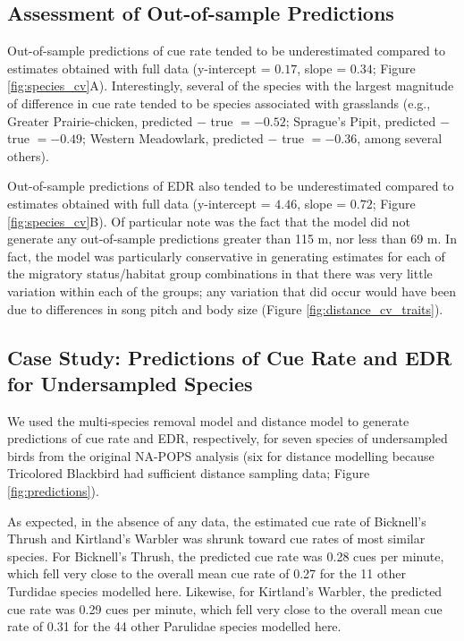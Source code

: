 \documentclass[12pt]{article}
\begin{document}
\subsection{Assessment of Out-of-sample Predictions}

\par Out-of-sample predictions of cue rate tended to be underestimated compared to estimates obtained with full data (y-intercept = $0.17$, slope = $0.34$; Figure \ref{fig:species_cv}A).
Interestingly, several of the species with the largest magnitude of difference in cue rate tended to be species associated with grasslands (e.g., Greater Prairie-chicken, predicted $-$ true $= -0.52$; Sprague's Pipit, predicted $-$ true $= -0.49$; Western Meadowlark, predicted $-$ true $= -0.36$, among several others).

\par Out-of-sample predictions of EDR also tended to be underestimated compared to estimates obtained with full data (y-intercept = $4.46$, slope = $0.72$; Figure \ref{fig:species_cv}B).
Of particular note was the fact that the model did not generate any out-of-sample predictions greater than 115 m, nor less than 69 m.
In fact, the model was particularly conservative in generating estimates for each of the migratory status/habitat group combinations in that there was very little variation within each of the groups; any variation that did occur would have been due to differences in song pitch and body size (Figure \ref{fig:distance_cv_traits}).

\subsection{Case Study: Predictions of Cue Rate and EDR for Undersampled Species}

\par We used the multi-species removal model and distance model to generate predictions of cue rate and EDR, respectively, for seven species of undersampled birds from the original NA-POPS analysis (six for distance modelling because Tricolored Blackbird had sufficient distance sampling data; Figure \ref{fig:predictions}).

\par As expected, in the absence of any data, the estimated cue rate of Bicknell’s Thrush and Kirtland’s Warbler was shrunk toward cue rates of most similar species.
For Bicknell's Thrush, the predicted cue rate was 0.28 cues per minute, which fell very close to the overall mean cue rate of 0.27 for the 11 other Turdidae species modelled here.
Likewise, for Kirtland's Warbler, the predicted cue rate was 0.29 cues per minute, which fell very close to the overall mean cue rate of 0.31 for the 44 other Parulidae species modelled here.
\end{document}
